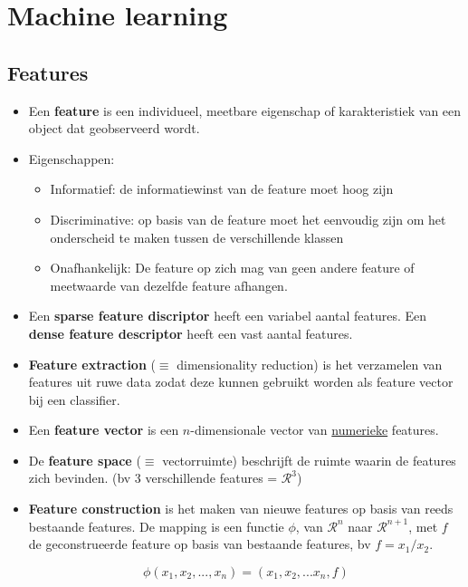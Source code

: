 \chapter{Machine learning}
\section{Features}
\begin{itemize}
	\item Een \textbf{feature} is een individueel, meetbare eigenschap of karakteristiek van een object dat geobserveerd wordt.
	\item Eigenschappen:
	\begin{itemize}
		\item Informatief: de informatiewinst van de feature moet hoog zijn
		\item Discriminative: op basis van de feature moet het eenvoudig zijn om het onderscheid te maken tussen de verschillende klassen
		\item Onafhankelijk: De feature op zich mag van geen andere feature of meetwaarde van dezelfde feature afhangen.


	\end{itemize}
	\item Een \textbf{sparse feature discriptor} heeft een variabel aantal features. Een \textbf{dense feature descriptor} heeft een vast aantal features.
	\item \textbf{Feature extraction} ($\equiv$ dimensionality reduction) is het verzamelen van features uit ruwe data zodat deze kunnen gebruikt worden als feature vector bij een classifier. 
	\item Een \textbf{feature vector} is een $n$-dimensionale vector van \underline{numerieke} features.
	\item De \textbf{feature space} ($\equiv$ vectorruimte) beschrijft de ruimte waarin de features zich bevinden. (bv 3 verschillende features = $\mathcal{R}^3$)
	\item \textbf{Feature construction} is het maken van nieuwe features op basis van reeds bestaande features. De mapping is een functie $\phi$, van $\mathcal{R}^n$ naar $\mathcal{R}^{n + 1}$, met $f$ de geconstrueerde feature op basis van bestaande features, bv $f = x_1/x_2$.
	
	$$\phi(x_1, x_2, ..., x_n) = (x_1, x_2, ... x_n, f)$$

\end{itemize}
